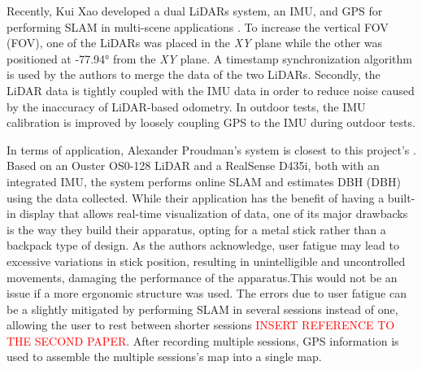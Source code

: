 
Recently, Kui Xao developed a dual \acs*{LiDAR}s system, an \acs*{IMU}, and \acs*{GPS} for performing \acs*{SLAM} in multi-scene applications \cite{xiao_high-precision_2022}. To increase the vertical \acl*{FOV} (\acs*{FOV}), one of the \acs*{LiDAR}s was placed in the \textit{XY} plane while the other was positioned at -77.94° from the \textit{XY} plane. A timestamp synchronization algorithm is used by the authors to merge the data of the two \acs*{LiDAR}s. Secondly, the \acs*{LiDAR} data is tightly coupled with the IMU data in order to reduce noise caused by the inaccuracy of \acs*{LiDAR}-based odometry. In outdoor tests, the \acs*{IMU} calibration is improved by loosely coupling \acs*{GPS} to the \acs*{IMU} during outdoor tests.

In terms of application, Alexander Proudman's system is closest to this project's \cite{proudman_online_2021}. Based on an Ouster OS0-128 \acs{LiDAR} and a RealSense D435i, both with an integrated \acs{IMU}, the system performs online \acs{SLAM} and estimates \acl{DBH} (\acs*{DBH}) using the data collected. While their application has the benefit of having a built-in display that allows real-time visualization of data, one of its major drawbacks is the way they build their apparatus, opting for a metal stick rather than a backpack type of design. As the authors acknowledge, user fatigue may lead to excessive variations in stick position, resulting in unintelligible and uncontrolled movements, damaging the performance of the apparatus.This would not be an issue if a more ergonomic structure was used. The errors due to user fatigue can be a slightly mitigated by performing \acs{SLAM} in several sessions instead of one, allowing the user to rest between shorter sessions \textcolor{red}{INSERT REFERENCE TO THE SECOND PAPER}. After recording multiple sessions, \acs*{GPS} information is used to assemble the multiple sessions's map into a single map.